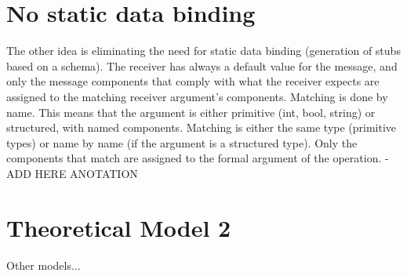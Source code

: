 \section{No static data binding}
\label{section:noDataBinding}

The other idea is eliminating the need for static data binding (generation of stubs based on a schema). The receiver has
always a default value for the message, and only the message components that comply with what the receiver expects are
assigned to the matching receiver argument's components. Matching is done by name. This means that the argument is either
primitive (int, bool, string) or structured, with named components. Matching is either the same type (primitive types) or
name by name (if the argument is a structured type). Only the components that match are assigned to the formal argument of
the operation.
-ADD HERE  ANOTATION

\section{Theoretical Model 2}
\label{section:theory2}

Other models...

